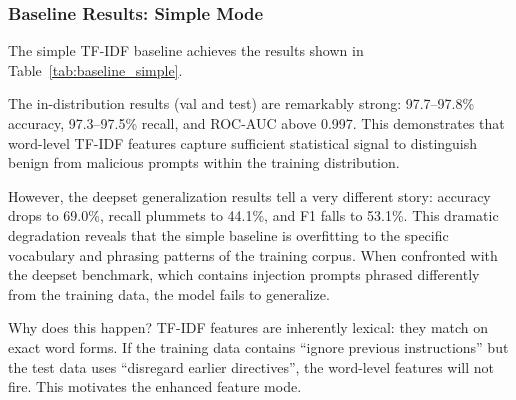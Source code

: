\documentclass[12pt, letterpaper]{article}   %
\begin{document}
\subsubsection{Baseline Results: Simple Mode}

The simple TF-IDF baseline achieves the results shown in Table~\ref{tab:baseline_simple}.

\begin{table}[h!]
    \centering
    \renewcommand{\arraystretch}{1.5}
    \caption{Performance of the Simple TF-IDF + Logistic Regression baseline across all evaluation splits.}
    \label{tab:baseline_simple}
\end{table}

The in-distribution results (val and test) are remarkably strong: 97.7--97.8\% accuracy, 97.3--97.5\% recall, and ROC-AUC above 0.997. This demonstrates that word-level TF-IDF features capture sufficient statistical signal to distinguish benign from malicious prompts within the training distribution.

However, the deepset generalization results tell a very different story: accuracy drops to 69.0\%, recall plummets to 44.1\%, and F1 falls to 53.1\%. This dramatic degradation reveals that the simple baseline is overfitting to the specific vocabulary and phrasing patterns of the training corpus. When confronted with the deepset benchmark, which contains injection prompts phrased differently from the training data, the model fails to generalize.

Why does this happen? TF-IDF features are inherently lexical: they match on exact word forms. If the training data contains ``ignore previous instructions'' but the test data uses ``disregard earlier directives'', the word-level features will not fire. This motivates the enhanced feature mode.
\end{document}
